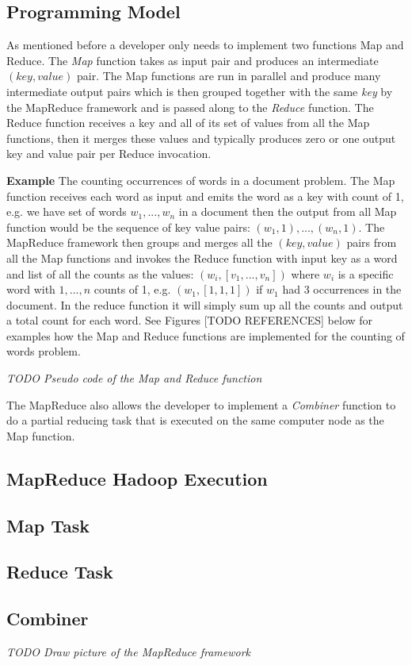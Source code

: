 \subsection{Programming Model}
As mentioned before a developer only needs to implement two functions Map and Reduce. The \textit{Map} function takes as input pair and produces an intermediate $(key,value)$ pair. The Map functions are run in parallel and produce many intermediate output pairs which is then grouped together with the same \textit{key} by the MapReduce framework and is passed along to the \textit{Reduce} function. The Reduce function receives a key and all of its set of values from all the Map functions, then it merges these values and typically produces zero or one output key and value pair per Reduce invocation. 

\textbf{Example} The counting occurrences of words in a document problem. The Map function receives each word as input and emits the word as a key with count of 1, e.g. we have set of words $w_1,...,w_n$ in a document then the output from all Map function would be the sequence of key value pairs: $(w_1,1),...,(w_n,1)$. The MapReduce framework then groups and merges all the $(key,value)$ pairs from all the Map functions and invokes the Reduce function with input key as a word and list of all the counts as the values: $(w_i,[v_1,...,v_n])$ where $w_i$ is a specific word with $1,...,n$ counts of 1, e.g. $(w_1, [1,1,1])$ if $w_1$ had 3 occurrences in the document. In the reduce function it will simply sum up all the counts and output a total count for each word. See Figures [TODO REFERENCES] below for examples how the Map and Reduce functions are implemented for the counting of words problem.


\textit{TODO Pseudo code of the Map and Reduce function}

The MapReduce also allows the developer to implement a \textit{Combiner} function to do a partial reducing task that is executed on the same computer node as the Map function. 


\subsection{MapReduce Hadoop Execution}

\subsection*{Map Task}

\subsection*{Reduce Task}

\subsection*{Combiner}


\textit{TODO Draw picture of the MapReduce framework}


\lipsum[7-8]


